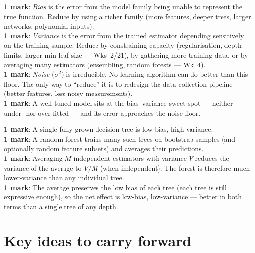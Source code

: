 \documentclass[11pt, a4paper]{article}
\begin{document}
\begin{exambox}
\textbf{1 mark}: \emph{Bias} is the error from the model family being unable to represent the true function. Reduce by using a richer family (more features, deeper trees, larger networks, polynomial inputs). \\
\textbf{1 mark}: \emph{Variance} is the error from the trained estimator depending sensitively on the training sample. Reduce by constraining capacity (regularisation, depth limits, larger min leaf size — Wks~2/21), by gathering more training data, or by averaging many estimators (ensembling, random forests — Wk~4). \\
\textbf{1 mark}: \emph{Noise} ($\sigma^2$) is irreducible. No learning algorithm can do better than this floor. The only way to ``reduce'' it is to redesign the data collection pipeline (better features, less noisy measurements). \\
\textbf{1 mark}: A well-tuned model sits at the bias--variance sweet spot — neither under- nor over-fitted — and its error approaches the noise floor.
\end{exambox}

\begin{exambox}
\textbf{1 mark}: A single fully-grown decision tree is low-bias, high-variance. \\
\textbf{1 mark}: A random forest trains many such trees on bootstrap samples (and optionally random feature subsets) and averages their predictions. \\
\textbf{1 mark}: Averaging $M$ independent estimators with variance $V$ reduces the variance of the average to $V/M$ (when independent). The forest is therefore much lower-variance than any individual tree. \\
\textbf{1 mark}: The average preserves the low bias of each tree (each tree is still expressive enough), so the net effect is low-bias, low-variance — better in both terms than a single tree of any depth.
\end{exambox}

\section*{Key ideas to carry forward}
\end{document}
